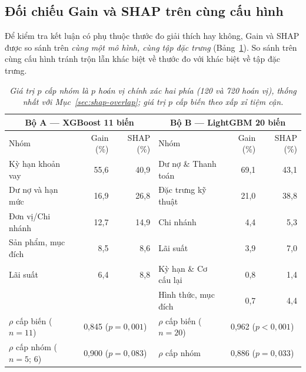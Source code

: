 \subsection{Đối chiếu Gain và SHAP trên cùng cấu hình}
\label{sec:gain-vs-shap}

Để kiểm tra kết luận có phụ thuộc thước đo giải thích hay không, Gain và SHAP được so sánh trên \emph{cùng một mô hình, cùng tập đặc trưng} (Bảng~\ref{tab:gain-vs-shap}). So sánh trên cùng cấu hình tránh trộn lẫn khác biệt về thước đo với khác biệt về tập đặc trưng.

\begin{table}[H]
\centering
\caption{Gain và SHAP trên cùng mô hình: tỷ trọng nhóm và tương quan hạng Spearman}
\label{tab:gain-vs-shap}
\begin{tabular}{|l|r|r||l|r|r|}
\hline
\multicolumn{3}{|c||}{Bộ A --- XGBoost 11 biến} & \multicolumn{3}{c|}{Bộ B --- LightGBM 20 biến}\\
\hline
Nhóm & Gain (\%) & SHAP (\%) & Nhóm & Gain (\%) & SHAP (\%)\\
\hline
Kỳ hạn khoản vay & 55,6 & 40,9 & Dư nợ \& Thanh toán & 69,1 & 43,1\\
Dư nợ và hạn mức & 16,9 & 26,8 & Đặc trưng kỹ thuật & 21,0 & 38,8\\
Đơn vị/Chi nhánh & 12,7 & 14,9 & Chi nhánh & 4,4 & 5,3\\
Sản phẩm, mục đích & 8,5 & 8,6 & Lãi suất & 3,9 & 7,0\\
Lãi suất & 6,4 & 8,8 & Kỳ hạn \& Cơ cấu lại & 0,8 & 1,4\\
 & & & Hình thức, mục đích & 0,7 & 4,4\\
\hline
$\rho$ cấp biến ($n=11$) & \multicolumn{2}{c||}{0,845 ($p=0,001$)} & $\rho$ cấp biến ($n=20$) & \multicolumn{2}{c|}{0,962 ($p<0,001$)}\\
$\rho$ cấp nhóm ($n=5$; $6$) & \multicolumn{2}{c||}{0,900 ($p=0,083$)} & $\rho$ cấp nhóm & \multicolumn{2}{c|}{0,886 ($p=0,033$)}\\
\hline
\end{tabular}
\caption*{\textit{Giá trị $p$ cấp nhóm là $p$ hoán vị chính xác hai phía (120 và 720 hoán vị), thống nhất với Mục~\ref{sec:shap-overlap}; giá trị $p$ cấp biến theo xấp xỉ tiệm cận.}}
\end{table}


